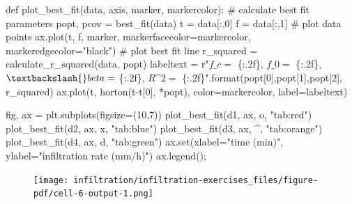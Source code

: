 \documentclass[
  letterpaper,
  DIV=11,
  numbers=noendperiod]{scrreprt}
\newenvironment{Shaded}{\begin{snugshade}}{\end{snugshade}}
\newcommand{\BuiltInTok}[1]{\textcolor[rgb]{0.00,0.23,0.31}{#1}}
\newcommand{\CommentTok}[1]{\textcolor[rgb]{0.37,0.37,0.37}{#1}}
\newcommand{\DecValTok}[1]{\textcolor[rgb]{0.68,0.00,0.00}{#1}}
\newcommand{\KeywordTok}[1]{\textcolor[rgb]{0.00,0.23,0.31}{#1}}
\newcommand{\NormalTok}[1]{\textcolor[rgb]{0.00,0.23,0.31}{#1}}
\newcommand{\OperatorTok}[1]{\textcolor[rgb]{0.37,0.37,0.37}{#1}}
\newcommand{\SpecialCharTok}[1]{\textcolor[rgb]{0.37,0.37,0.37}{#1}}
\newcommand{\StringTok}[1]{\textcolor[rgb]{0.13,0.47,0.30}{#1}}
\newcommand{\VerbatimStringTok}[1]{\textcolor[rgb]{0.13,0.47,0.30}{#1}}
\begin{document}
\begin{Shaded}
\begin{Highlighting}[]
\KeywordTok{def}\NormalTok{ plot\_best\_fit(data, axis, marker, markercolor):}
    \CommentTok{\# calculate best fit parameters}
\NormalTok{    popt, pcov }\OperatorTok{=}\NormalTok{ best\_fit(data)}
\NormalTok{    t }\OperatorTok{=}\NormalTok{ data[:,}\DecValTok{0}\NormalTok{]}
\NormalTok{    f }\OperatorTok{=}\NormalTok{ data[:,}\DecValTok{1}\NormalTok{]}
    \CommentTok{\# plot data points}
\NormalTok{    ax.plot(t, f, marker, markerfacecolor}\OperatorTok{=}\NormalTok{markercolor, markeredgecolor}\OperatorTok{=}\StringTok{"black"}\NormalTok{)}
    \CommentTok{\# plot best fit line}
\NormalTok{    r\_squared }\OperatorTok{=}\NormalTok{ calculate\_r\_squared(data, popt)}
\NormalTok{    labeltext }\OperatorTok{=} \VerbatimStringTok{r"$f\_c=$ }\SpecialCharTok{\{:.2f\}}\VerbatimStringTok{, $f\_0=$ }\SpecialCharTok{\{:.2f\}}\VerbatimStringTok{, $\textbackslash{}beta=$ }\SpecialCharTok{\{:.2f\}}\VerbatimStringTok{, $R\^{}2=$ }\SpecialCharTok{\{:.2f\}}\VerbatimStringTok{"}\NormalTok{.}\BuiltInTok{format}\NormalTok{(popt[}\DecValTok{0}\NormalTok{],popt[}\DecValTok{1}\NormalTok{],popt[}\DecValTok{2}\NormalTok{], r\_squared)}
\NormalTok{    ax.plot(t, horton(t}\OperatorTok{{-}}\NormalTok{t[}\DecValTok{0}\NormalTok{], }\OperatorTok{*}\NormalTok{popt), color}\OperatorTok{=}\NormalTok{markercolor, label}\OperatorTok{=}\NormalTok{labeltext)    }

\NormalTok{fig, ax }\OperatorTok{=}\NormalTok{ plt.subplots(figsize}\OperatorTok{=}\NormalTok{(}\DecValTok{10}\NormalTok{,}\DecValTok{7}\NormalTok{))}
\NormalTok{plot\_best\_fit(d1, ax, }\StringTok{\textquotesingle{}o\textquotesingle{}}\NormalTok{, }\StringTok{"tab:red"}\NormalTok{)}
\NormalTok{plot\_best\_fit(d2, ax, }\StringTok{\textquotesingle{}x\textquotesingle{}}\NormalTok{, }\StringTok{"tab:blue"}\NormalTok{)}
\NormalTok{plot\_best\_fit(d3, ax, }\StringTok{\textquotesingle{}\^{}\textquotesingle{}}\NormalTok{, }\StringTok{"tab:orange"}\NormalTok{)}
\NormalTok{plot\_best\_fit(d4, ax, }\StringTok{\textquotesingle{}d\textquotesingle{}}\NormalTok{, }\StringTok{"tab:green"}\NormalTok{)}
\NormalTok{ax.}\BuiltInTok{set}\NormalTok{(xlabel}\OperatorTok{=}\StringTok{"time (min)"}\NormalTok{,}
\NormalTok{       ylabel}\OperatorTok{=}\StringTok{"infiltration rate (mm/h)"}\NormalTok{)}
\NormalTok{ax.legend()}\OperatorTok{;}
\end{Highlighting}
\end{Shaded}

\begin{figure}[H]

{\centering \texttt{[image: infiltration/infiltration-exercises\_files/figure-pdf/cell-6-output-1.png]}

}

\end{figure}
\end{document}

